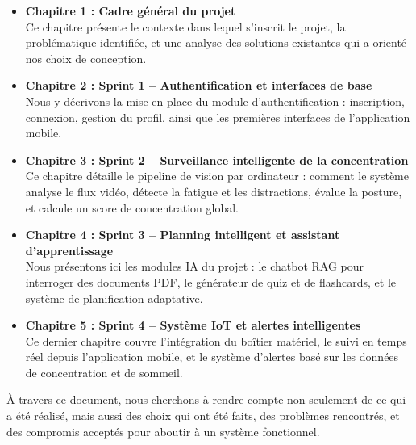 \begin{itemize}
    \item \textbf{Chapitre 1 : Cadre général du projet} \\
    Ce chapitre présente le contexte dans lequel s’inscrit le projet, la problématique identifiée, et une analyse des solutions existantes qui a orienté nos choix de conception.

    \item \textbf{Chapitre 2 : Sprint 1 – Authentification et interfaces de base} \\
    Nous y décrivons la mise en place du module d’authentification : inscription, connexion, gestion du profil, ainsi que les premières interfaces de l’application mobile.

    \item \textbf{Chapitre 3 : Sprint 2 – Surveillance intelligente de la concentration} \\
    Ce chapitre détaille le pipeline de vision par ordinateur : comment le système analyse le flux vidéo, détecte la fatigue et les distractions, évalue la posture, et calcule un score de concentration global.

    \item \textbf{Chapitre 4 : Sprint 3 – Planning intelligent et assistant d’apprentissage} \\
    Nous présentons ici les modules IA du projet : le chatbot RAG pour interroger des documents PDF, le générateur de quiz et de flashcards, et le système de planification adaptative.

    \item \textbf{Chapitre 5 : Sprint 4 – Système IoT et alertes intelligentes} \\
    Ce dernier chapitre couvre l’intégration du boîtier matériel, le suivi en temps réel depuis l’application mobile, et le système d’alertes basé sur les données de concentration et de sommeil.
\end{itemize}

À travers ce document, nous cherchons à rendre compte non seulement de ce qui a été réalisé, mais aussi des choix qui ont été faits, des problèmes rencontrés, et des compromis acceptés pour aboutir à un système fonctionnel.

\clearpage

